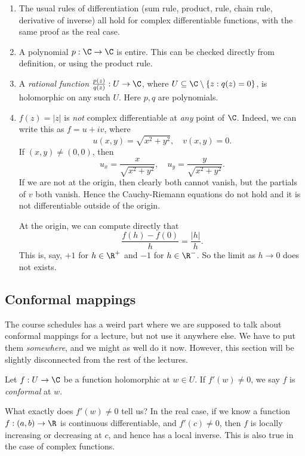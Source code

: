 \documentclass[a4paper]{article}
\begin{document}
\begin{eg}\leavevmode
  \begin{enumerate}
    \item The usual rules of differentiation (sum rule, product, rule, chain rule, derivative of inverse) all hold for complex differentiable functions, with the same proof as the real case.
    \item A polynomial $p: \C \to \C$ is entire. This can be checked directly from definition, or using the product rule.
    \item A \emph{rational function} $\frac{p(z)}{q(z)}: U \to \C$, where $U \subseteq \C \setminus \{z: q(z) = 0\}$, is holomorphic on any such $U$. Here $p, q$ are polynomials.
    \item $f(z) = |z|$ is \emph{not} complex differentiable at \emph{any} point of $\C$. Indeed, we can write this as $f = u + iv$, where
      \[
        u(x, y) = \sqrt{x^2 + y^2},\quad v(x, y) = 0.
      \]
      If $(x, y) \not= (0, 0)$, then
      \[
        u_x = \frac{x}{\sqrt{x^2 + y^2}},\quad u_y = \frac{y}{\sqrt{x^2 + y^2}}.
      \]
      If we are not at the origin, then clearly both cannot vanish, but the partials of $v$ both vanish. Hence the Cauchy-Riemann equations do not hold and it is not differentiable outside of the origin.

      At the origin, we can compute directly that
      \[
        \frac{f(h) - f(0)}{h} = \frac{|h|}{h}.
      \]
      This is, say, $+1$ for $h \in \R^+$ and $-1$ for $h \in \R^-$. So the limit as $h \to 0$ does not exists.
  \end{enumerate}
\end{eg}

\subsection{Conformal mappings}
The course schedules has a weird part where we are supposed to talk about conformal mappings for a lecture, but not use it anywhere else. We have to put them \emph{somewhere}, and we might as well do it now. However, this section will be slightly disconnected from the rest of the lectures.

\begin{defi}
  Let $f: U \to \C$ be a function holomorphic at $w \in U$. If $f'(w) \not= 0$, we say $f$ is \emph{conformal} at $w$.
\end{defi}

What exactly does $f'(w) \not= 0$ tell us? In the real case, if we know a function $f: (a, b) \to \R$ is continuous differentiable, and $f'(c) \not= 0$, then $f$ is locally increasing or decreasing at $c$, and hence has a local inverse. This is also true in the case of complex functions.
\end{document}
